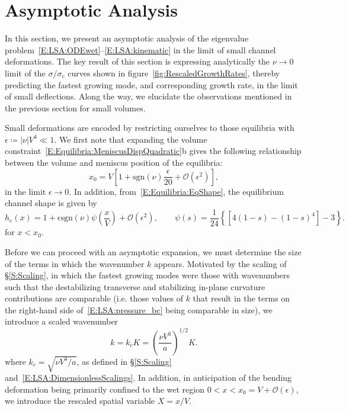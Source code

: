 \documentclass{jfm}
\newcommand{\order}[1]{\mathcal{O}\left(#1\right)}
\begin{document}
\section{Asymptotic Analysis}\label{S:Asymptotics}
\newcommand{\param}{\delta} %
In this section, we present an asymptotic analysis of the eigenvalue problem~\eqref{E:LSA:ODEwet}--\eqref{E:LSA:kinematic}  in the limit of small channel deformations. The key result of this section is expressing analytically the $\nu \to 0$ limit of the $\sigma/\sigma_c$ curves shown in figure~\ref{fig:RescaledGrowthRates}, thereby predicting the fastest growing mode, and corresponding growth rate, in the limit of small deflections. Along the way, we elucidate the observations mentioned in the previous section for small volumes.

Small deformations are encoded by restricting ourselves to those equilibria with $\epsilon  \coloneqq |\nu| V^4 \ll 1$. We first note that expanding the volume constraint~\eqref{E:Equilibria:MeniscusDispQuadratic}b gives the following relationship between the volume and meniscus position of the  equilibria:
\begin{equation}\label{E:Asymptotics:EqMeniscusPositionExpansion}
    x_0 = V\left[1 + \mathrm{sgn}(\nu) \frac{\epsilon}{20} + \order{\epsilon^2}\right],
\end{equation}
in the limit $\epsilon \to 0$. In addition, from~\eqref{E:Equilibria:EqShape}, the equilibrium channel shape is given by
\begin{equation}\label{E:Asymptotics:EqChannelShapeExpansion}
    h_e(x) = 1 + \epsilon \mathrm{sgn}(\nu)\psi\left(\frac{x}{V}\right) + \order{\epsilon^2}, \qquad \psi(s) = \frac{1}{24}\left\{\left[4(1-s) - (1-s)^4\right]-3\right\}.
\end{equation}
for $x < x_0$.

Before we can proceed with an asymptotic expansion, we must determine the size of the terms in which the wavenumber $k$ appears. Motivated by the scaling of \S\ref{S:Scaling}, in which the fastest growing modes were those with wavenumbers such that the destabilizing transverse and stabilizing in-plane curvature contributions are comparable (i.e. those values of $k$ that result in the terms on the right-hand side of~\eqref{E:LSA:pressure_bc} being comparable in size), we introduce a scaled wavenumber
\begin{equation}\label{E:Asymptotics:RescaledWavenumber}
k = k_c K = \left(\frac{\nu V^3}{a}\right)^{1/2} K.
\end{equation}
where $k_c = \sqrt{\nu V^3 /a}$, as defined in \S\ref{S:Scaling} and~\eqref{E:LSA:DimensionlessScalings}. In addition, in anticipation of the bending deformation being primarily confined to the wet region $0 < x < x_0 = V + \mathcal{O}(\epsilon)$, we introduce the rescaled spatial variable $X = x/V$. 
\end{document}
